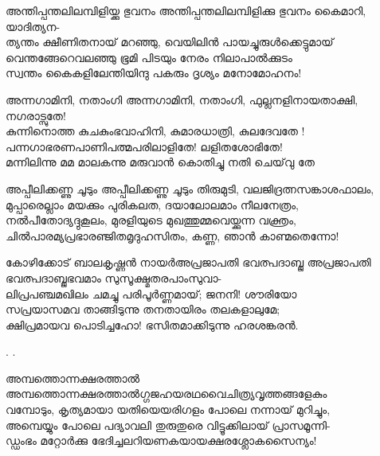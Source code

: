 \begin{enumerate}

\begin{slokam}{\VSv}{\HM}{അന്തിപ്പന്തലിലമ്പിളിയ്ക്കു ഭുവനം}
അന്തിപ്പന്തലിലമ്പിളിക്കു ഭുവനം കൈമാറി, യാദിത്യന-\\
ത്യന്തം ക്ഷീണിതനായ് മറഞ്ഞു, വെയിലിൻ പായച്ചുരുൾക്കെട്ടുമായ്\\
വെന്തങ്ങേറെവലഞ്ഞു ഭൂമി പിടയും നേരം നിലാപാൽക്കുടം\\
സ്വന്തം കൈകളിലേന്തിയിന്ദു പകരും ദൃശ്യം മനോമോഹനം!
\end{slokam}


\begin{slokam}{\VKm}{\KJ}{അന്നഗാമിനി, നതാംഗി}
അന്നഗാമിനി, നതാംഗി, ഫുല്ലനളിനായതാക്ഷി, നഗരാട്സുതേ!\\
കുന്നിനൊത്ത കുചകുംഭവാഹിനി, കുമാരധാത്രി, കുലദേവതേ !\\
പന്നഗാഭരണപാണിപത്മപരിലാളിതേ! ലളിതശോഭിതേ!\\
മന്നിലിന്നു മമ മാലകന്നു മരുവാൻ കൊതിച്ചു  നതി ചെയ്‌വു തേ
\end{slokam}


\begin{slokam}{\VSr}{\VKG}{അപ്പീലിക്കണ്ണു ചൂടും}
അപ്പീലിക്കണ്ണു ചൂടും തിരുമുടി, വലജിദ്രത്നസങ്കാശഫാലം,\\
മുപ്പാരെല്ലാം മയക്കും പുരികലത, ദയാലോലമാം നീലനേത്രം,\\
നൽപീതോദ്യദ്ദുകൂലം, മുരളിയുടെ മുഖത്തുമ്മവെയ്ക്കുന്ന വക്ത്രം,\\
ചിൽപാരമ്യപ്രഭാരഞ്ജിതമൃദുഹസിതം, കണ്ണ, ഞാൻ കാണ്മതെന്നോ!
\end{slokam}


\begin{slokam}{\VKm}{കോഴിക്കോട് ബാലകൃഷ്ണൻ നായർ}{അപ്രജാപതി ഭവത്പദാബ്ജ}
അപ്രജാപതി ഭവത്പദാബ്ജഭവമാം സുസൂക്ഷ്മതരപാംസുവാ- \\
ലിപ്രപഞ്ചമഖിലം ചമച്ചു പരിപൂർണ്ണമായ്; ജനനി! ശൗരിയോ \\
സപ്രയാസമവ താങ്ങിടുന്നു തനതായിരം തലകളാലുമേ;  \\ 
ക്ഷിപ്രമായവ പൊടിച്ചഹോ! ഭസിതമാക്കിടുന്നു ഹരശങ്കരൻ. 
\end{slokam}


.
.

\begin{slokam}{\VSr}{\UN}{അമ്പത്തൊന്നക്ഷരത്താൽ}
അമ്പത്തൊന്നക്ഷരത്താൽഗ്ഗജഹയരഥവൈചിത്ര്യവൃത്തങ്ങളേകും \\
വമ്പോടും, കൃത്യമായാ യതിയെയരിഗളം പോലെ നന്നായ് മുറിച്ചും,\\
അമ്പെയ്യും പോലെ പദ്യാവലി തുരുതുരെ വിട്ടൂക്കിലായ് പ്രാസമൂന്നി-\\
ഡ്ഡംഭം മറ്റോർക്കു ഭേദിച്ചലറിയണകയായക്ഷരശ്ലോകസൈന്യം!
\end{slokam}


\end{enumerate}
